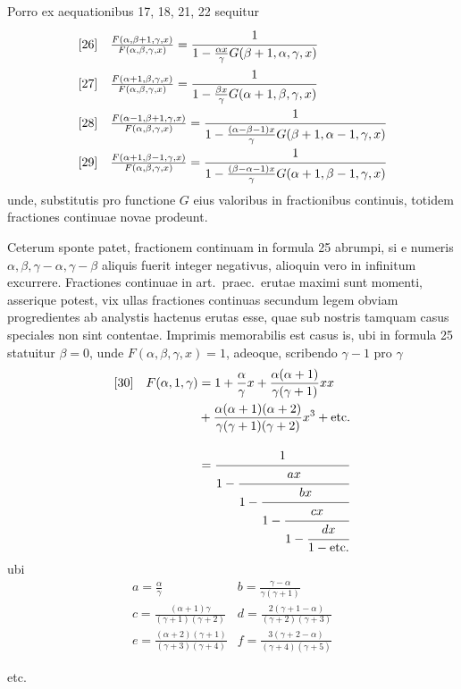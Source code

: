 Porro ex aequationibus 17, 18, 21, 22 sequitur
\[
\begin{array}{rl}
[26]&\frac{F(\alpha,\beta+1,\gamma,x)}{F(\alpha,\beta,\gamma,x)}=\cfrac{1}{1-\frac{\alpha x}{\gamma}G(\beta+1,\alpha,\gamma,x)}\\[12pt]
[27]&\frac{F(\alpha+1,\beta,\gamma,x)}{F(\alpha,\beta,\gamma,x)}=\cfrac{1}{1-\frac{\beta x}{\gamma}G(\alpha+1,\beta,\gamma,x)}\\[12pt]
[28]&\frac{F(\alpha-1,\beta+1,\gamma,x)}{F(\alpha,\beta,\gamma,x)}=\cfrac{1}{1-\frac{(\alpha-\beta-1)x}{\gamma}G(\beta+1,\alpha-1,\gamma,x)}\\[12pt]
[29]&\frac{F(\alpha+1,\beta-1,\gamma,x)}{F(\alpha,\beta,\gamma,x)}=\cfrac{1}{1-\frac{(\beta-\alpha-1)x}{\gamma}G(\alpha+1,\beta-1,\gamma,x)}
\end{array}
\]
unde, substitutis pro functione $G$ eius valoribus in fractionibus continuis, totidem fractiones continuae novae prodeunt.

Ceterum sponte patet, fractionem continuam in formula 25 abrumpi, si e numeris $\alpha,\beta,\gamma-\alpha,\gamma-\beta$ aliquis fuerit integer negativus, alioquin vero in infinitum excurrere.
Fractiones continuae in art.\ praec.\ erutae maximi sunt momenti, asserique potest, vix ullas fractiones continuas secundum legem obviam progredientes ab analystis hactenus erutas esse, quae sub nostris tamquam casus speciales non sint contentae. Imprimis memorabilis est casus is, ubi in formula 25 statuitur $\beta=0$, unde $F(\alpha,\beta,\gamma,x)=1$, adeoque, scribendo $\gamma-1$ pro $\gamma$
\[
\begin{aligned}
{}[30]\quad F(\alpha,1,\gamma)&=1+\frac{\alpha}{\gamma}x+\frac{\alpha(\alpha+1)}{\gamma(\gamma+1)}xx\\&{}+\frac{\alpha(\alpha+1)(\alpha+2)}{\gamma(\gamma+1)(\gamma+2)}x^3+\hbox{etc.}\\[9pt]
&=\cfrac{1}{1-\cfrac{ax}{1-\cfrac{bx}{1-\cfrac{cx}{1-\cfrac{dx}{1-\hbox{etc.}}}}}}
\end{aligned}
\]
ubi
\[
\begin{array}{ll}
a=\frac{\alpha}{\gamma}&b=\frac{\gamma-\alpha}{\gamma(\gamma+1)}\\[6pt]
c=\frac{(\alpha+1)\gamma}{(\gamma+1)(\gamma+2)}&d=\frac{2(\gamma+1-\alpha)}{(\gamma+2)(\gamma+3)}\\[6pt]
e=\frac{(\alpha+2)(\gamma+1)}{(\gamma+3)(\gamma+4)}&f=\frac{3(\gamma+2-\alpha)}{(\gamma+4)(\gamma+5)}
\end{array}
\]
\begin{center}etc.\end{center}

